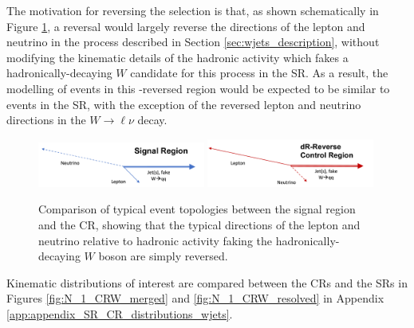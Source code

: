 The motivation for reversing the \DeltaR selection is that, as shown schematically in Figure \ref{fig:CRW_topology}, a \DeltaR reversal would largely reverse the directions of the lepton and neutrino in the \wjets process described in Section \ref{sec:wjets_description}, without modifying the kinematic details of the hadronic activity which fakes a hadronically-decaying \(W\) candidate for this process in the SR. As a result, the modelling of \wjets events in this \DeltaR-reversed region would be expected to be similar to \wjets events in the SR, with the exception of the reversed lepton and neutrino directions in the \(W\rightarrow\ell\nu\) decay.

\begin{figure}[htbp]
  \centering
  \includegraphics[width=0.49\textwidth]{figures/5/SR_topology.pdf}
  \includegraphics[width=0.49\textwidth]{figures/5/CRW_topology.pdf}
  \caption[Topologies in SR vs. CRW]{Comparison of typical event topologies between the signal region and the \wjets CR, showing that the typical directions of the lepton and neutrino relative to hadronic activity faking the hadronically-decaying \(W\) boson are simply reversed.}
  \label{fig:CRW_topology}
\end{figure}

Kinematic distributions of interest are compared between the \wjets CRs and the SRs in Figures \ref{fig:N_1_CRW_merged} and \ref{fig:N_1_CRW_resolved} in Appendix \ref{app:appendix_SR_CR_distributions_wjets}. 

